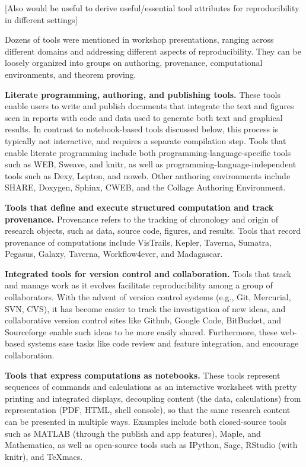 \documentclass[11pt]{article}
\newcommand{\comment}[1]{{\color{blue} [#1]}}
\newcommand{\comment}[1]{}
\begin{document}
\comment{Also would be useful
to derive useful/essential tool attributes for reproducibility in different
settings}

Dozens of tools were mentioned in workshop presentations, ranging
across different domains and addressing different aspects of
reproducibility.  They can be loosely organized into groups on authoring,
provenance, computational environments, and theorem proving.  

{\bf Literate programming, authoring, and publishing tools.} These tools enable
users to write and publish documents that integrate the text and figures
seen in reports with code and data used to generate both text and graphical
results. In contrast to notebook-based tools discussed below, 
this process is typically not
interactive, and requires a separate compilation step. Tools that enable
literate programming include both programming-language-specific tools such
as WEB, Sweave, and knitr, as well as programming-language-independent tools
such as Dexy, Lepton, and noweb. Other authoring environments include SHARE,
Doxygen, Sphinx, CWEB, and the Collage Authoring Environment.



{\bf Tools that define and execute structured computation and track
provenance.}
Provenance refers to the tracking of chronology and origin of research
objects, such as data, source code, figures, and results. Tools that record
provenance of computations include VisTrails, Kepler, Taverna, Sumatra,
Pegasus, Galaxy, Taverna, Workflow4ever, and Madagascar.

{\bf Integrated tools for version control and collaboration.}  Tools that track
and manage work as it evolves facilitate reproducibility among a group of
collaborators.  With the advent of version control systems (e.g., Git,
Mercurial, SVN, CVS), it has become easier to track the investigation of new
ideas, and collaborative version control sites like Github, Google Code,
BitBucket, and Sourceforge enable such ideas to be more easily shared.
Furthermore, these web-based systems ease tasks like code review and feature
integration, and encourage collaboration.

{\bf Tools that express computations as notebooks.} These tools represent
sequences of commands and calculations as an interactive worksheet with
pretty printing and integrated displays, decoupling content (the data,
calculations) from representation (PDF, HTML, shell console), so that the
same research content can be presented in multiple ways. Examples include
both closed-source tools such as MATLAB (through the publish and app
features), Maple, and Mathematica, as well as open-source tools such as
IPython, Sage, RStudio (with knitr), and TeXmacs.
\end{document}
